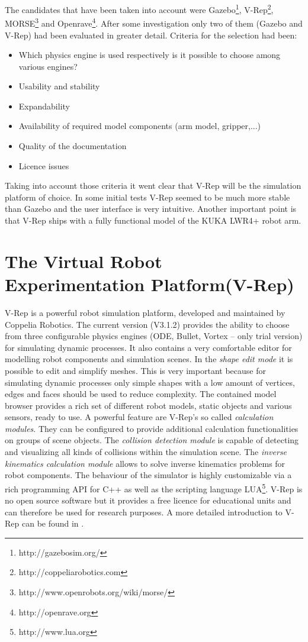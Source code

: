 The candidates that have been taken into account were Gazebo\footnote{http://gazebosim.org/}, V-Rep\footnote{http://coppeliarobotics.com}, MORSE\footnote{http://www.openrobots.org/wiki/morse/} and Openrave\footnote{http://openrave.org}. After some investigation only two of them (Gazebo and V-Rep) had been evaluated in greater detail. Criteria for the selection had been:

\begin{itemize}
\item
Which physics engine is used respectively is it possible to choose among various engines?
\item
Usability and stability
\item
Expandability
\item
Availability of required model components (arm model, gripper,...)
\item
Quality of the documentation
\item
Licence issues
\end{itemize}

Taking into account those criteria it went clear that V-Rep will be the simulation platform of choice. In some initial tests V-Rep seemed to be much more stable than Gazebo and the user interface is very intuitive. Another important point is that V-Rep ships with a fully functional model of the KUKA LWR4+ robot arm.

\section{The Virtual Robot Experimentation Platform(V-Rep)}
V-Rep is a powerful robot simulation platform, developed and maintained by Coppelia Robotics. The current version (V3.1.2) provides the ability to choose from three configurable physics engines (ODE, Bullet, Vortex -- only trial version) for simulating dynamic processes. It also contains a very comfortable editor for modelling robot components and simulation scenes. In the \emph{shape edit mode} it is possible to edit and simplify meshes. This is very important because for simulating dynamic processes only simple shapes with a low amount of vertices, edges and faces should be used to reduce complexity. The contained model browser provides a rich set of different robot models, static objects and various sensors, ready to use. A powerful feature are V-Rep's so called \emph{calculation modules}. They can be configured to provide additional calculation functionalities on groups of scene objects. The \emph{collision detection module} is capable of detecting and visualizing all kinds of collisions within the simulation scene. The \emph{inverse kinematics calculation module} allows to solve inverse kinematics problems for robot components. The behaviour of the simulator is highly customizable via a rich programming API for C++ as well as the scripting language LUA\footnote{http://www.lua.org}. V-Rep is no open source software but it provides a free licence for educational units and can therefore be used for research purposes. A more detailed introduction to V-Rep can be found in \cite{freese2013}.

